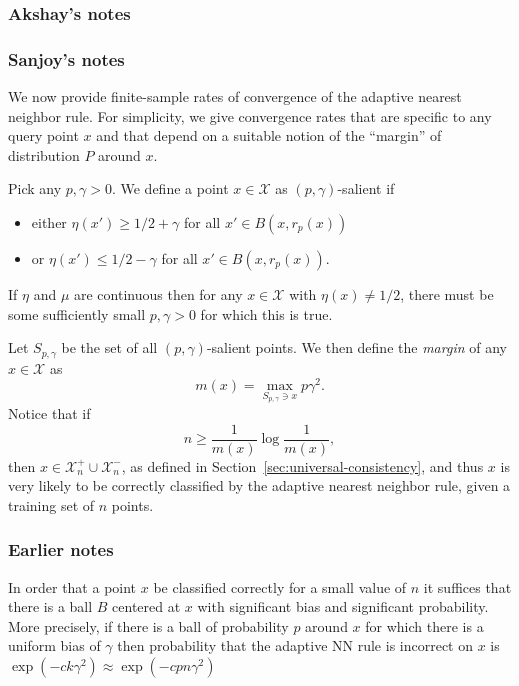 \documentclass{article}
\def\X{{\mathcal X}}
\newcommand{\comment}[3]{}  %
\newcommand{\shay}[1]{\comment{purple}{Shay}{#1}}
\newcommand{\akshay}[1]{\comment{blue}{Akshay}{#1}}
\begin{document}
\subsubsection{Akshay's notes}


\subsubsection{Sanjoy's notes}
We now provide finite-sample rates of convergence of the adaptive nearest neighbor rule. For simplicity, we give convergence rates that are specific to any query point $x$ and that depend on a suitable notion of the ``margin'' of distribution $P$ around $x$.

Pick any $p, \gamma > 0$. We define a point $x \in \X$ as $(p, \gamma)$-salient if 
\begin{itemize}
\item either $\eta(x') \geq 1/2 + \gamma$ for all $x' \in B(x, r_p(x))$
\item or $\eta(x') \leq 1/2 - \gamma$ for all $x' \in B(x, r_p(x))$.
\end{itemize}
If $\eta$ and $\mu$ are continuous then for any $x \in \X$ with $\eta(x) \neq 1/2$, there must be some sufficiently small $p, \gamma > 0$ for which this is true.

Let $S_{p, \gamma}$ be the set of all $(p, \gamma)$-salient points. We then define the {\it margin} of any $x \in \X$ as
$$ m(x) = \max_{S_{p, \gamma} \ni x} p \gamma^2 .$$
Notice that if 
$$ n \geq \frac{1}{m(x)} \log \frac{1}{m(x)} ,$$
then $x \in \X_n^+ \cup \X_n^-$, as defined in Section~\ref{sec:universal-consistency}, and thus $x$ is very likely to be correctly classified by the adaptive nearest neighbor rule, given a training set of $n$ points.
\shay{Should $\gamma,p$ depend on $\delta$ for this containment to hold? Note that the definitions of $\X_n^+,\X_n^-$ do depend on $\delta$.}
\akshay{Agreed, as in \Cref{thm:fastrate2}.}

\subsubsection{Earlier notes}

In order that a point $x$ be classified correctly for a small value of $n$ it suffices that there is a ball $B$ centered at $x$ with significant bias and significant probability. More precisely, if there is a ball of probability $p$ around $x$ for which there is a uniform bias of $\gamma$ then probability that the adaptive NN rule is incorrect 
on $x$ is $\exp(-c k \gamma^2) \approx \exp(-c p n \gamma^2)$
\end{document}
